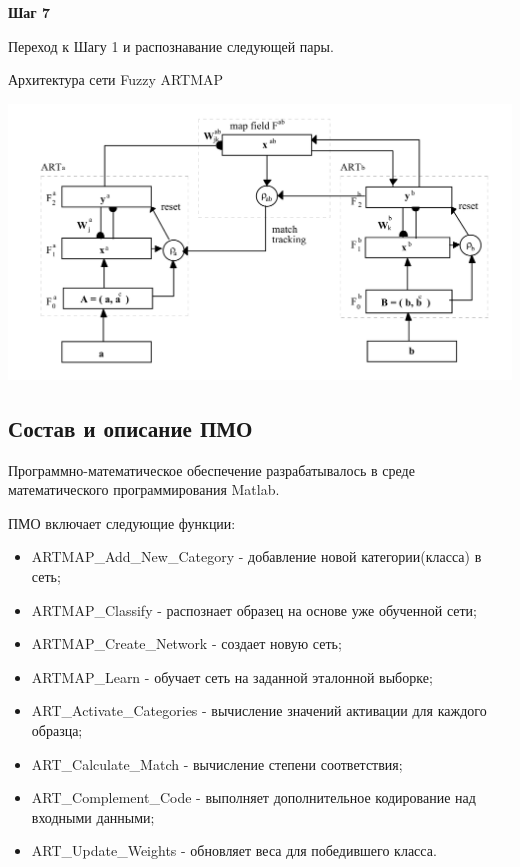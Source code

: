 \textbf{Шаг 7}

Переход к Шагу 1 и распознавание следующей пары.

\begin{center}
	Архитектура сети Fuzzy ARTMAP

	\includegraphics[width=14cm]{image_for_report/scheme.jpg}
\end{center}




\subsection{Состав и описание ПМО}

Программно-математическое обеспечение разрабатывалось в среде математического программирования Matlab.

ПМО включает следующие функции:
\begin{itemize}
	\item ARTMAP_Add_New_Category - добавление новой категории(класса) в сеть;
	\item ARTMAP_Classify - распознает образец на основе уже обученной сети;
	\item ARTMAP_Create_Network - создает новую сеть;
	\item ARTMAP_Learn - обучает сеть на заданной эталонной выборке;
	\item ART_Activate_Categories - вычисление значений активации для каждого образца;
	\item ART_Calculate_Match - вычисление степени соответствия;
	\item ART_Complement_Code - выполняет дополнительное кодирование над входными данными;
	\item ART_Update_Weights - обновляет веса для победившего класса.
\end{itemize}

